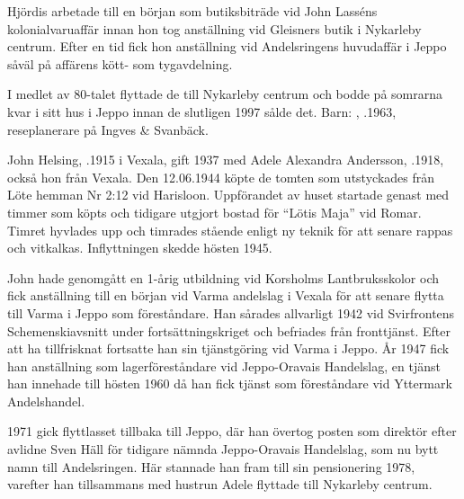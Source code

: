 Hjördis arbetade till en början som butiksbiträde vid John Lasséns kolonialvaruaffär innan hon tog anställning vid Gleisners butik i Nykarleby centrum. Efter en tid fick hon anställning vid Andelsringens huvudaffär i Jeppo såväl på affärens kött- som tygavdelning.

I medlet av 80-talet flyttade de till Nykarleby centrum och bodde på 	somrarna kvar i sitt hus i Jeppo innan de slutligen 1997 sålde det.
Barn:  , .1963, reseplanerare på Ingves \& Svanbäck.


%
John Helsing, .1915 i Vexala, gift 1937 med Adele Alexandra Andersson, .1918, också hon från Vexala. Den 12.06.1944  köpte de tomten som utstyckades från Löte hemman Nr 2:12 vid Harisloon. Uppförandet av huset startade genast med timmer som 	köpts och tidigare utgjort bostad för ``Lötis Maja'' vid Romar. Timret hyvlades upp och timrades stående enligt ny teknik för att senare 	rappas och vitkalkas. Inflyttningen skedde hösten 1945.

John hade genomgått en 1-årig utbildning vid Korsholms Lantbruksskolor och fick anställning till en början vid Varma andelslag i	Vexala för att senare flytta till Varma i Jeppo som föreståndare. Han sårades allvarligt 1942 vid Svirfrontens Schemenskiavsnitt	under fortsättningskriget och befriades från fronttjänst. Efter att ha tillfrisknat fortsatte han sin tjänstgöring vid Varma i Jeppo. År 1947	fick han anställning som lagerföreståndare vid Jeppo-Oravais Handelslag, en tjänst han innehade till hösten 1960 då han fick tjänst som 	föreståndare vid Yttermark Andelshandel.

1971 gick flyttlasset tillbaka till Jeppo, där han övertog posten som	direktör efter avlidne Sven Häll för tidigare nämnda Jeppo-Oravais	Handelslag, som nu bytt namn till Andelsringen. Här stannade han	fram till sin pensionering 1978, varefter han tillsammans med hustrun Adele flyttade till Nykarleby centrum.

